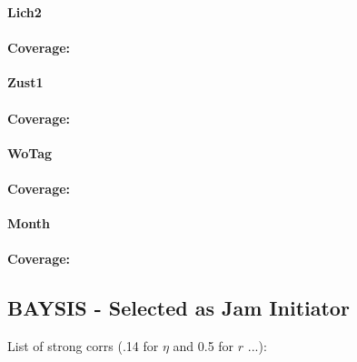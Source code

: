 \large
\centerline{\textbf{Lich2}}
\normalsize

\paragraph{Coverage:}

\large
\centerline{\textbf{Zust1}}
\normalsize

\paragraph{Coverage:}

\large
\centerline{\textbf{WoTag}}
\normalsize

\paragraph{Coverage:}

\large
\centerline{\textbf{Month}}
\normalsize

\paragraph{Coverage:}

\subsection{BAYSIS - Selected as Jam Initiator}

List of strong corrs (.14 for $\eta$ and 0.5 for $r$ ...):

